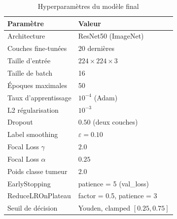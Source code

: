\documentclass[12pt, a4paper]{report}
\begin{document}
\begin{table}[h]
  \centering
  \caption{Hyperparamètres du modèle final}
  \label{tab:hyperparams}
  \begin{tabular}{ll}
    \toprule
    \textbf{Paramètre} & \textbf{Valeur} \\
    \midrule
    Architecture           & ResNet50 (ImageNet) \\
    Couches fine-tunées    & 20 dernières \\
    Taille d'entrée        & $224 \times 224 \times 3$ \\
    Taille de batch        & 16 \\
    Époques maximales      & 50 \\
    Taux d'apprentissage   & $10^{-4}$ (Adam) \\
    L2 régularisation      & $10^{-3}$ \\
    Dropout                & $0.50$ (deux couches) \\
    Label smoothing        & $\varepsilon = 0.10$ \\
    Focal Loss $\gamma$    & $2.0$ \\
    Focal Loss $\alpha$    & $0.25$ \\
    Poids classe tumeur    & $2.0$ \\
    EarlyStopping          & patience = 5 (val\_loss) \\
    ReduceLROnPlateau      & factor = 0.5, patience = 3 \\
    Seuil de décision      & Youden, clamped $[0.25, 0.75]$ \\
    \bottomrule
  \end{tabular}
\end{table}
\end{document}
